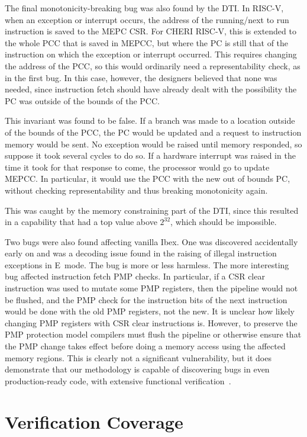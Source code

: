 \documentclass[10pt,conference]{IEEEtran}
\begin{document}
The final monotonicity-breaking bug was also found by the DTI. In RISC-V,
when an exception or interrupt occurs, the address of the running/next to
run instruction is saved to the MEPC CSR. For CHERI RISC-V, this is
extended to the whole PCC that is saved in MEPCC,
but where the PC is still that of the instruction on which the exception or
interrupt occurred.   This requires changing the address of the PCC,
so this would ordinarily need a representability check, as in the first
bug. In this case, however, the designers believed that none was needed, since
instruction fetch should have already dealt with the possibility the PC
was outside of the bounds of the PCC.

This invariant was found to be false. If a branch was made to a location
outside of the bounds of the PCC, the PC would be updated and a request to
instruction memory would be sent.  No exception would be raised until
memory responded, so suppose it took several cycles to do so.  If a
hardware interrupt was raised in the time it took for that response to
come, the processor would go to update MEPCC. In particular, it would use
the PCC with the new out of bounds PC, without checking representability
and thus breaking monotonicity again.

This was caught by the memory constraining part of the DTI, since this resulted in a capability that
had a top value above $2^{32}$, which should be impossible.

Two bugs were also found affecting vanilla Ibex. One was discovered
accidentally early on and was a decoding issue found in the raising of
illegal instruction exceptions in E~mode. The bug is more or less harmless.
The more interesting bug affected instruction fetch PMP checks. In
particular, if a CSR clear instruction was used to mutate some PMP registers,
then the pipeline would not be flushed, and the PMP check for the
instruction bits of the next instruction would be done with the old PMP
registers, not the new.
It is unclear how likely changing PMP registers with CSR clear instructions is.
However, to preserve the PMP protection model compilers must flush the pipeline or otherwise ensure that the PMP change takes effect before doing a memory access using the affected memory regions.
This is clearly not a significant vulnerability,
but it does demonstrate that our methodology is capable of discovering bugs
in even production-ready code, with extensive functional verification~\cite{ibex-verification}.

\section{Verification Coverage}\label{sec:coverage}
\end{document}
